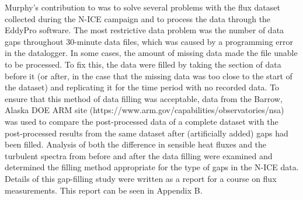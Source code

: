 Murphy's contribution to \cite{walden:2017} was to solve several problems with the flux dataset collected during the N-ICE campaign and to process the data through the EddyPro software. The most restrictive data problem was the number of data gaps throughout 30-minute data files, which was caused by a programming error in the datalogger. In some cases, the amount of missing data made the file unable to be processed. To fix this, the data were filled by taking the section of data before it (or after, in the case that the missing data was too close to the start of the dataset) and replicating it for the time period with no recorded data. To ensure that this method of data filling was acceptable, data from the Barrow, Alaska DOE ARM site (https://www.arm.gov/capabilities/observatories/nsa) was used to compare the post-processed data of a complete dataset with the post-processed results from the same dataset after (artificially added) gaps had been filled. Analysis of both the difference in sensible heat fluxes and the turbulent spectra from before and after the data filling were examined and determined the filling method appropriate for the type of gaps in the N-ICE data. Details of this gap-filling study were written as a report for a course on flux measurements. This report can be seen in Appendix B. 